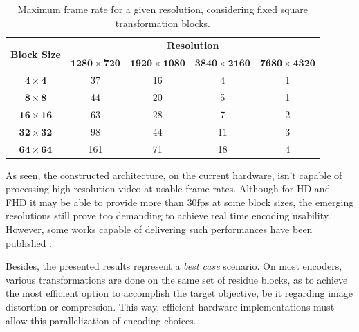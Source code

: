 \begin{table}[!htpb]
    \centering
    \begin{tabular}{ccccc} \toprule
        \multirow{2}{*}{\textbf{Block Size}}   & \multicolumn{4}{c}{\textbf{Resolution}}                      \\
                                         & $\mathbf{1280\times 720}$    & $\mathbf{1920\times 1080}$  & $\mathbf{3840\times 2160}$  & $\mathbf{7680\times 4320}$  \\ \toprule
        $\mathbf{4\times 4}$                       & 37                      & 16                   & 4                    & 1  \\
        $\mathbf{8\times 8}$                       & 44                      & 20                   & 5                    & 1  \\
        $\mathbf{16\times 16}$                      & 63                      & 28                   & 7                    & 2  \\
        $\mathbf{32\times 32}$                      & 98                      & 44                   & 11                   & 3  \\
        $\mathbf{64\times 64}$                      & 161                     & 71                   & 18                   & 4  \\
        \bottomrule
    \end{tabular}
    \caption{Maximum frame rate for a given resolution, considering fixed square transformation blocks.}
    \label{tab:maxfps}
\end{table}

As seen, the constructed architecture, on the current hardware, isn't capable of processing high resolution video at usable frame rates. Although for HD and FHD it may be able to provide more than 30fps at some block sizes, the emerging resolutions still prove too demanding to achieve real time encoding usability. However, some works capable of delivering such performances have been published \cite{vayalilEfficientASICDesign2016,meherEfficientIntegerDCT2014,m.HighPerformanceInteger2017}.

Besides, the presented results represent a \emph{best case} scenario. On most encoders, various transformations are done on the same set of residue blocks, as to achieve the most efficient option to accomplish the target objective, be it regarding image distortion or compression. This way, efficient hardware implementations must allow this parallelization of encoding choices.

